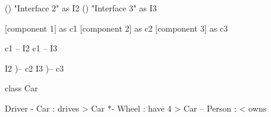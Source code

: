 \documentclass{scrartcl}
\begin{document}
	\begin{plantuml}
		() "Interface 2" as I2
		() "Interface 3" as I3

		[component 1] as c1
		[component 2] as c2
		[component 3] as c3

		c1 -- I2
		c1 -- I3

		I2 )-- c2
		I3 )-- c3
	\end{plantuml}

\newpage

	\begin{plantuml}
		class Car

		Driver - Car : drives >
		Car *- Wheel : have 4 >
		Car -- Person : < owns
	\end{plantuml}
\end{document}

